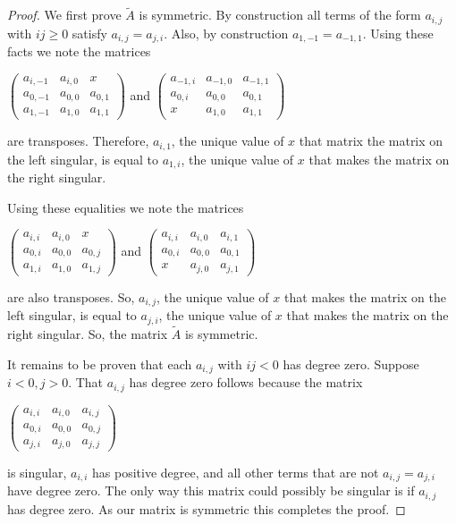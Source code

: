 \documentclass{article}
\begin{document}
\begin{proof}
  We first prove $\tilde{A}$ is symmetric. By construction all terms of the form $a_{i,j}$ with $ij \geq 0$ satisfy $a_{i,j} = a_{j,i}$. Also, by construction $a_{1,-1} = a_{-1,1}$. Using these facts we note the matrices   
  \begin{center}
    $\left(\begin{array}{ccc} a_{i,-1} & a_{i,0} & x \\ a_{0,-1} & a_{0,0} & a_{0,1} \\ a_{1,-1} & a_{1,0} & a_{1,1} \end{array}\right)$ \hspace{.1 in} and \hspace{.1 in} $\left(\begin{array}{ccc} a_{-1,i} & a_{-1,0} & a_{-1,1} \\ a_{0,i} & a_{0,0} & a_{0,1} \\ x & a_{1,0} & a_{1,1} \end{array}\right)$
  \end{center} 
  are transposes. Therefore, $a_{i,1}$, the unique value of $x$ that matrix the matrix on the left singular, is equal to $a_{1,i}$, the unique value of $x$ that makes the matrix on the right singular.
  
  Using these equalities we note the matrices
  \begin{center}    
    $\left(\begin{array}{ccc} a_{i,i} & a_{i,0} & x \\ a_{0,i} & a_{0,0} & a_{0,j} \\ a_{1,i} & a_{1,0} & a_{1,j} \end{array}\right)$ \hspace{.1 in} and \hspace{.1 in} $\left(\begin{array}{ccc} a_{i,i} & a_{i,0} & a_{i,1} \\ a_{0,i} & a_{0,0} & a_{0,1} \\ x & a_{j,0} & a_{j,1} \end{array}\right)$
  \end{center}  
  are also transposes. So, $a_{i,j}$, the unique value of $x$ that makes the matrix on the left singular, is equal to $a_{j,i}$, the unique value of $x$ that makes the matrix on the right singular. So, the matrix $\tilde{A}$ is symmetric.
  
  It remains to be proven that each $a_{i,j}$ with $ij < 0$ has degree zero. Suppose $i < 0, j > 0$. That $a_{i,j}$ has degree zero follows because the matrix
  \begin{center}
    $\left(\begin{array}{ccc} a_{i,i} & a_{i,0} & a_{i,j} \\ a_{0,i} & a_{0,0} & a_{0,j} \\ a_{j,i} & a_{j,0} & a_{j,j} \end{array}\right)$
  \end{center}   
  is singular, $a_{i,i}$ has positive degree, and all other terms that are not $a_{i,j} = a_{j,i}$ have degree zero. The only way this matrix could possibly be singular is if $a_{i,j}$ has degree zero. As our matrix is symmetric this completes the proof.
\end{proof}
\end{document}
